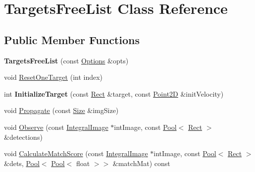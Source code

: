 \hypertarget{classTargetsFreeList}{}\section{Targets\+Free\+List Class Reference}
\label{classTargetsFreeList}
\subsection*{Public Member Functions}
\begin{DoxyCompactItemize}
\item 
\hypertarget{classTargetsFreeList_a09b62a42db80be05c572804054d83125}{}{\bfseries Targets\+Free\+List} (const \hyperlink{structOptions}{Options} \&opts)\label{classTargetsFreeList_a09b62a42db80be05c572804054d83125}

\item 
void \hyperlink{classTargetsFreeList_abfbc250eed26923b56582c862cf1d254}{Reset\+One\+Target} (int index)
\item 
\hypertarget{classTargetsFreeList_aa07866a0019c82181fa866f8cd2bfda9}{}int {\bfseries Initialize\+Target} (const \hyperlink{classRect}{Rect} \&target, const \hyperlink{classPoint2D}{Point2\+D} \&init\+Velocity)\label{classTargetsFreeList_aa07866a0019c82181fa866f8cd2bfda9}

\item 
void \hyperlink{classTargetsFreeList_abd311cfa3633ed0268aab9ae8135deae}{Propagate} (const \hyperlink{classSize}{Size} \&img\+Size)
\item 
void \hyperlink{classTargetsFreeList_a6dbfd6eb0734fa5adc094ebffc6b4926}{Observe} (const \hyperlink{classIntegralImage}{Integral\+Image} $\ast$int\+Image, const \hyperlink{classPool}{Pool}$<$ \hyperlink{classRect}{Rect} $>$ \&detections)
\item 
void \hyperlink{classTargetsFreeList_a9eefc5f9a7aa50987295205d1ee1b36e}{Calculate\+Match\+Score} (const \hyperlink{classIntegralImage}{Integral\+Image} $\ast$int\+Image, const \hyperlink{classPool}{Pool}$<$ \hyperlink{classRect}{Rect} $>$ \&dets, \hyperlink{classPool}{Pool}$<$ \hyperlink{classPool}{Pool}$<$ float $>$$>$ \&match\+Mat) const 
\end{DoxyCompactItemize}
